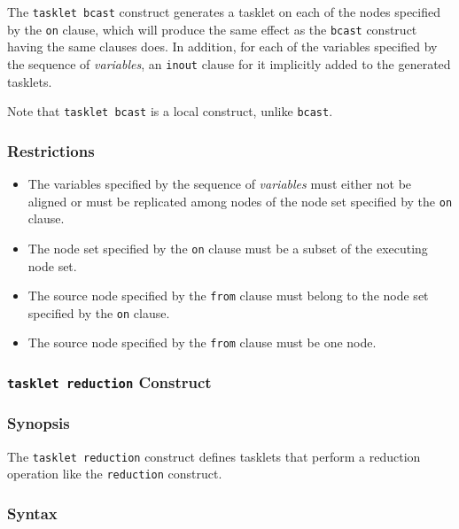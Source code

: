 The \verb|tasklet bcast| construct generates a tasklet on each of the
nodes specified by the \verb|on| clause, which will produce the same
effect as the \verb|bcast| construct having the same clauses does. In
addition, for each of the variables specified by the sequence of {\it
variables}, an \verb|inout| clause for it implicitly added to the
generated tasklets.

Note that \verb|tasklet bcast| is a local construct, unlike
\verb|bcast|.

\subsubsection*{Restrictions}

\begin{itemize}
 \item The variables specified by the sequence of {\it variables} must
       either not be aligned or must be replicated among nodes of the
       node set specified by the {\tt on} clause.
 \item The node set specified by the {\tt on} clause must be a subset of
       the executing node set.
 \item The source node specified by the {\tt from} clause must belong to
       the node set specified by the {\tt on} clause.
 \item The source node specified by the {\tt from} clause must be one
	   node.
\end{itemize}


%
%

\subsubsection{{\tt tasklet reduction} Construct}

\subsubsection*{Synopsis}

The \verb|tasklet reduction| construct defines tasklets that perform a
reduction operation like the \verb|reduction| construct.

\subsubsection*{Syntax}

